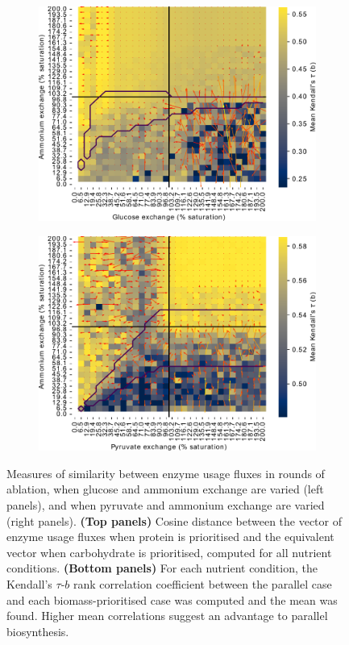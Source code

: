 \begin{figure}
  \begin{subfigure}[t]{0.45\textwidth}
  \centering
    \includegraphics[width=\linewidth]{ec_grid_glc_amm_kendall}
    \caption{
    }
    \label{fig:model-noisy-glc-kendall}
  \end{subfigure}%
  \begin{subfigure}[t]{0.45\textwidth}
  \centering
    \includegraphics[width=\linewidth]{ec_grid_pyr_amm_kendall}
    \caption{
    }
    \label{fig:model-noisy-pyr-kendall}
  \end{subfigure}

  \caption{
    Measures of similarity between enzyme usage fluxes in rounds of ablation, when glucose and ammonium exchange are varied (left panels), and when pyruvate and ammonium exchange are varied (right panels).
    \textbf{(Top panels)} Cosine distance between the vector of enzyme usage fluxes when protein is prioritised and the equivalent vector when carbohydrate is prioritised, computed for all nutrient conditions.
    \textbf{(Bottom panels)} For each nutrient condition, the Kendall's $\tau$-$b$ rank correlation coefficient between the parallel case and each biomass-prioritised case was computed and the mean was found.
    Higher mean correlations suggest an advantage to parallel biosynthesis.
  }
  \label{fig:model-noisy}
\end{figure}

